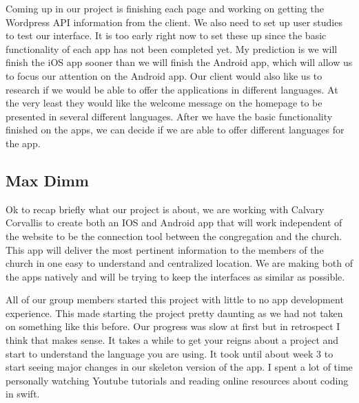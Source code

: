\documentclass[letterpaper,10pt,draftclsnofoot,onecolumn,titlepage]{IEEEtran}
\begin{document}
	Coming up in our project is finishing each page and working on getting the Wordpress API information from the client. 
	We also need to set up user studies to test our interface. 
	It is too early right now to set these up since the basic functionality of each app has not been completed yet. 
	My prediction is we will finish the iOS app sooner than we will finish the Android app, which will allow us to focus our attention on the Android app. 
	Our client would also like us to research if we would be able to offer the applications in different languages. 
	At the very least they would like the welcome message on the homepage to be presented in several different languages. 
	After we have the basic functionality finished on the apps, we can decide if we are able to offer different languages for the app. 
	
	
	\subsection{Max Dimm}
	Ok to recap briefly what our project is about, we are working with Calvary Corvallis to create both an IOS and Android app that will work independent of the website to be the connection tool between the congregation and the church. 
This app will deliver the most pertinent information to the members of the church in one easy to understand and centralized location. We are making both of the apps natively and will be trying to keep the interfaces as similar as possible. 

	All of our group members started this project with little to no app development experience. 
This made starting the project pretty daunting as we had not taken on something like this before. Our progress was slow at first but in retrospect I think that makes sense. 
It takes a while to get your reigns about a project and start to understand the language you are using. 
It took until about week 3 to start seeing major changes in our skeleton version of the app. 
I spent a lot of time personally watching Youtube tutorials and reading online resources about coding in swift. 
\end{document}
